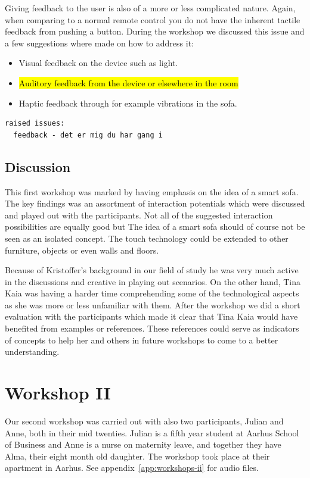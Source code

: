 Giving feedback to the user is also of a more or less complicated nature.
Again, when comparing to a normal remote control you do not have the inherent tactile feedback from pushing a button.
During the workshop we discussed this issue and a few suggestions where made on how to address it:
\begin{itemize}
  \item{Visual feedback on the device such as light.}
  \item{\hl{Auditory feedback from the device or elsewhere in the room} }
  \item{Haptic feedback through for example vibrations in the sofa.}
\end{itemize}

\begin{verbatim}
raised issues:
  feedback - det er mig du har gang i
\end{verbatim}

\subsection{Discussion}
\label{ch:workshops:workshop-i:discussion}

This first workshop was marked by having emphasis on the idea of a smart sofa.
The key findings was an assortment of interaction potentials which were discussed and played out with the participants.
Not all of the suggested interaction possibilities are equally good but \todo{\dots}
The idea of a smart sofa should of course not be seen as an isolated concept.
The touch technology could be extended to other furniture, objects or even walls and floors.

Because of Kristoffer's background in our field of study he was very much active in the discussions and creative in playing out scenarios.
On the other hand, Tina Kaia was having a harder time comprehending some of the technological aspects as she was more or less unfamiliar with them.
After the workshop we did a short evaluation with the participants which made it clear that Tina Kaia would have benefited from examples or references.
These references could serve as indicators of concepts to help her and others in future workshops to come to a better understanding.

\section{Workshop II}
\label{ch:workshops:workshop-ii}
Our second workshop was carried out with also two participants, Julian and Anne, both in their mid twenties.
Julian is a fifth year student at Aarhus School of Business and Anne is a nurse on maternity leave, and together they have Alma, their eight month old daughter.
The workshop took place at their apartment in Aarhus.
See appendix~\ref{app:workshops-ii} for  audio files.

